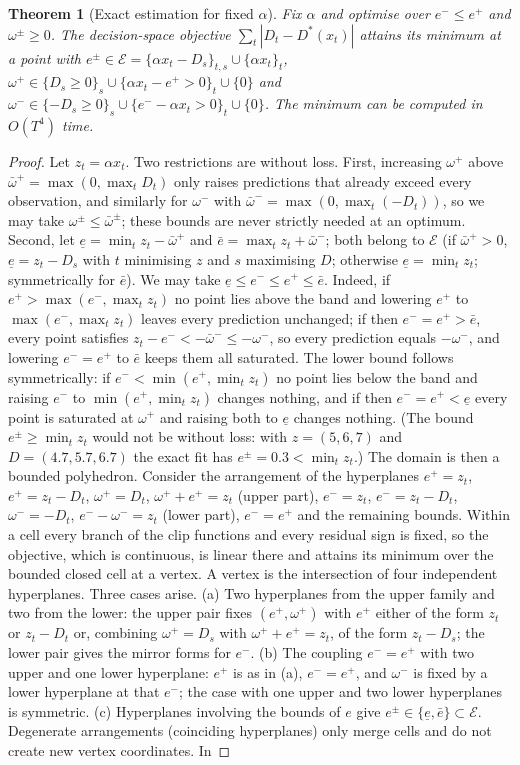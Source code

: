 \documentclass[11pt,a4paper]{article}
\newtheorem{theorem}{Theorem}
\theoremstyle{remark}\newtheorem{remark}{Remark}
\begin{document}
\begin{theorem}[Exact estimation for fixed $\alpha$]\label{thm:exact}
Fix $\alpha$ and optimise over $e^-\le e^+$ and $\omega^\pm\ge0$. The decision-space objective $\sum_t|D_t-D^*(x_t)|$ attains its minimum at a point with $e^\pm\in\mathcal{E}=\{\alpha x_t-D_s\}_{t,s}\cup\{\alpha x_t\}_t$, $\omega^+\in\{D_s\ge0\}_s\cup\{\alpha x_t-e^+>0\}_t\cup\{0\}$ and $\omega^-\in\{-D_s\ge0\}_s\cup\{e^--\alpha x_t>0\}_t\cup\{0\}$. The minimum can be computed in $O(T^4)$ time.
\end{theorem}
\begin{proof}
Let $z_t=\alpha x_t$. Two restrictions are without loss. First, increasing $\omega^+$ above $\bar\omega^+=\max(0,\max_tD_t)$ only raises predictions that already exceed every observation, and similarly for $\omega^-$ with $\bar\omega^-=\max(0,\max_t(-D_t))$, so we may take $\omega^\pm\le\bar\omega^\pm$; these bounds are never strictly needed at an optimum. Second, let $\underline e=\min_tz_t-\bar\omega^+$ and $\bar e=\max_tz_t+\bar\omega^-$; both belong to $\mathcal{E}$ (if $\bar\omega^+>0$, $\underline e=z_t-D_s$ with $t$ minimising $z$ and $s$ maximising $D$; otherwise $\underline e=\min_tz_t$; symmetrically for $\bar e$). We may take $\underline e\le e^-\le e^+\le\bar e$. Indeed, if $e^+>\max(e^-,\max_tz_t)$ no point lies above the band and lowering $e^+$ to $\max(e^-,\max_tz_t)$ leaves every prediction unchanged; if then $e^-=e^+>\bar e$, every point satisfies $z_t-e^-<-\bar\omega^-\le-\omega^-$, so every prediction equals $-\omega^-$, and lowering $e^-=e^+$ to $\bar e$ keeps them all saturated. The lower bound follows symmetrically: if $e^-<\min(e^+,\min_tz_t)$ no point lies below the band and raising $e^-$ to $\min(e^+,\min_tz_t)$ changes nothing, and if then $e^-=e^+<\underline e$ every point is saturated at $\omega^+$ and raising both to $\underline e$ changes nothing. (The bound $e^\pm\ge\min_tz_t$ would not be without loss: with $z=(5,6,7)$ and $D=(4.7,5.7,6.7)$ the exact fit has $e^\pm=0.3<\min_tz_t$.) The domain is then a bounded polyhedron. Consider the arrangement of the hyperplanes $e^+=z_t$, $e^+=z_t-D_t$, $\omega^+=D_t$, $\omega^++e^+=z_t$ (upper part), $e^-=z_t$, $e^-=z_t-D_t$, $\omega^-=-D_t$, $e^--\omega^-=z_t$ (lower part), $e^-=e^+$ and the remaining bounds. Within a cell every branch of the clip functions and every residual sign is fixed, so the objective, which is continuous, is linear there and attains its minimum over the bounded closed cell at a vertex. A vertex is the intersection of four independent hyperplanes. Three cases arise. (a) Two hyperplanes from the upper family and two from the lower: the upper pair fixes $(e^+,\omega^+)$ with $e^+$ either of the form $z_t$ or $z_t-D_t$ or, combining $\omega^+=D_s$ with $\omega^++e^+=z_t$, of the form $z_t-D_s$; the lower pair gives the mirror forms for $e^-$. (b) The coupling $e^-=e^+$ with two upper and one lower hyperplane: $e^+$ is as in (a), $e^-=e^+$, and $\omega^-$ is fixed by a lower hyperplane at that $e^-$; the case with one upper and two lower hyperplanes is symmetric. (c) Hyperplanes involving the bounds of $e$ give $e^\pm\in\{\underline e,\bar e\}\subset\mathcal{E}$. Degenerate arrangements (coinciding hyperplanes) only merge cells and do not create new vertex coordinates. In 
\end{proof}
\end{document}
